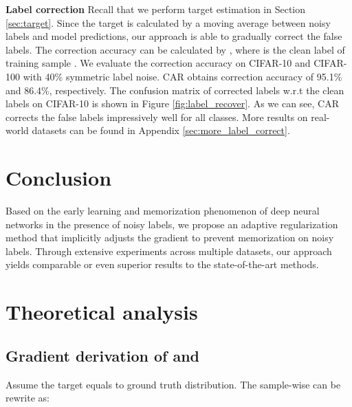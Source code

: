 \documentclass{article}
\begin{document}
\textbf{Label correction} Recall that we perform target estimation in Section \ref{sec:target}. Since the target is calculated by a moving average between noisy labels and model predictions, our approach is able to gradually correct the false labels. The correction accuracy can be calculated by , where  is the clean label of training sample . We evaluate the correction accuracy on CIFAR-10 and CIFAR-100 with 40\% symmetric label noise. CAR obtains correction accuracy of 95.1\% and 86.4\%, respectively. The confusion matrix of corrected labels w.r.t the clean labels on CIFAR-10 is shown in Figure \ref{fig:label_recover}. As we can see, CAR corrects the false labels impressively well for all classes. More results on real-world datasets can be found in Appendix \ref{sec:more_label_correct}.








\section{Conclusion}

Based on the early learning and memorization phenomenon of deep neural networks in the presence of noisy labels, we propose an adaptive regularization method that implicitly adjusts the gradient to prevent memorization on noisy labels. Through extensive experiments across multiple datasets, our approach yields comparable or even superior results to the state-of-the-art methods. 








\newpage









\appendix
\section{Theoretical analysis}
\setcounter{equation}{0}
\setcounter{lemma}{0}
\setcounter{theorem}{0}

\subsection{Gradient derivation of  and }
\label{apd:Grad_derivation}
Assume the target  equals to ground truth distribution. The sample-wise  can be rewrite as:
\end{document}
